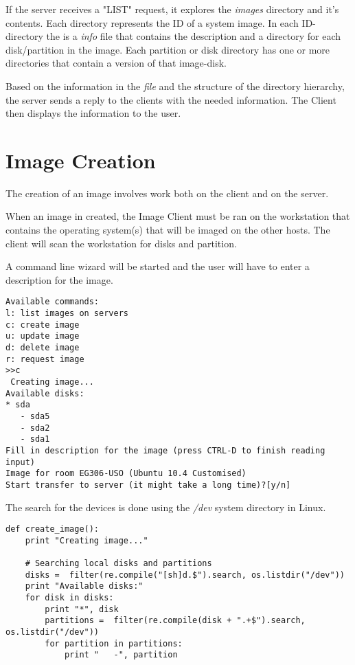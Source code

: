 If the server receives a "LIST" request, it explores the \emph{images}
directory and it's contents. Each directory represents the ID of a system
image. In each ID-directory the is a \emph{info} file that contains the
description and a directory for each disk/partition in the image. Each
partition or disk directory has one or more directories that contain a
version of that image-disk.

Based on the information in the \emph{file} and the structure of the
directory hierarchy, the server sends a reply to the clients with the
needed information. The Client then displays the information to the user.

\section{Image Creation}

The creation of an image involves work both on the client and on the
server. 

When an image in created, the Image Client must be ran on the workstation
that contains the operating system(s) that will be imaged on the other
hosts. The client will scan the workstation for disks and partition.

A command line wizard will be started and the user will have to enter a
description for the image.

\begin{lstlisting}[caption=Image creation wizard on Image Client]
Available commands:
l: list images on servers
c: create image
u: update image
d: delete image
r: request image
>>c
 Creating image...
Available disks:
* sda
   - sda5
   - sda2
   - sda1
Fill in description for the image (press CTRL-D to finish reading input)
Image for room EG306-USO (Ubuntu 10.4 Customised)
Start transfer to server (it might take a long time)?[y/n]

\end{lstlisting}

The search for the devices is done using the \emph{/dev} system directory
in Linux.


\begin{lstlisting}[float, caption=Code snip of device listing]
def create_image():
	print "Creating image..."

	# Searching local disks and partitions 
	disks =  filter(re.compile("[sh]d.$").search, os.listdir("/dev"))
	print "Available disks:"
	for disk in disks:
		print "*", disk
		partitions =  filter(re.compile(disk + ".+$").search,
os.listdir("/dev"))
		for partition in partitions:
			print "   -", partition
\end{lstlisting}

